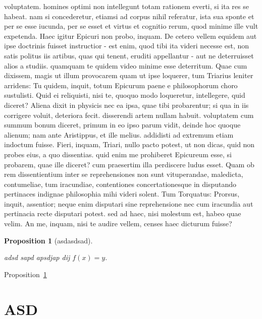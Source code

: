 \documentclass[
  a4paper,
]{book}
\numberwithin{equation}{section}
\theoremstyle{plain}
\newtheorem{proposition}{Proposition}[chapter]
\theoremstyle{remark}
\begin{document}
voluptatem. homines optimi non intellegunt totam rationem everti, si ita
res se habeat. nam si concederetur, etiamsi ad corpus nihil referatur,
ista sua sponte et per se esse iucunda, per se esset et virtus et
cognitio rerum, quod minime ille vult expetenda. Haec igitur Epicuri non
probo, inquam. De cetero vellem equidem aut ipse doctrinis fuisset
instructior - est enim, quod tibi ita videri necesse est, non satis
politus iis artibus, quas qui tenent, eruditi appellantur - aut ne
deterruisset alios a studiis. quamquam te quidem video minime esse
deterritum. Quae cum dixissem, magis ut illum provocarem quam ut ipse
loquerer, tum Triarius leniter arridens: Tu quidem, inquit, totum
Epicurum paene e philosophorum choro sustulisti. Quid ei reliquisti,
nisi te, quoquo modo loqueretur, intellegere, quid diceret? Aliena dixit
in physicis nec ea ipsa, quae tibi probarentur; si qua in iis corrigere
voluit, deteriora fecit. disserendi artem nullam habuit. voluptatem cum
summum bonum diceret, primum in eo ipso parum vidit, deinde hoc quoque
alienum; nam ante Aristippus, et ille melius. addidisti ad extremum
etiam indoctum fuisse. Fieri, inquam, Triari, nullo pacto potest, ut non
dicas, quid non probes eius, a quo dissentias. quid enim me prohiberet
Epicureum esse, si probarem, quae ille diceret? cum praesertim illa
perdiscere ludus esset. Quam ob rem dissentientium inter se
reprehensiones non sunt vituperandae, maledicta, contumeliae, tum
iracundiae, contentiones concertationesque in disputando pertinaces
indignae philosophia mihi videri solent. Tum Torquatus: Prorsus, inquit,
assentior; neque enim disputari sine reprehensione nec cum iracundia aut
pertinacia recte disputari potest. sed ad haec, nisi molestum est, habeo
quae velim. An me, inquam, nisi te audire vellem, censes haec dicturum
fuisse?

\leavevmode{}%
\begin{proposition}[asdasdsad]\label{prp-ASD}

adsd sapd apsdjap dij \(f(x) = y.\)

\end{proposition}

Proposition~\ref{prp-ASD}

\hypertarget{asd}{%
\section*{ASD}\label{asd}}

\end{document}

